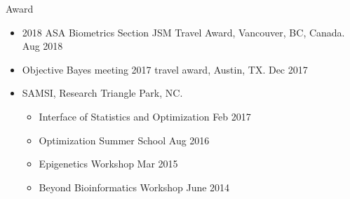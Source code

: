 \documentclass{resume} %
\begin{document}
\begin{rSection}{Award}
\begin{itemize}[noitemsep,topsep=0pt]
\item 2018 ASA Biometrics Section JSM Travel Award, Vancouver, BC, Canada. \hfill Aug 2018
\end{itemize}

\begin{itemize}[noitemsep,topsep=0pt]
\item Objective Bayes meeting 2017 travel award, Austin, TX. \hfill Dec 2017
\end{itemize}

\begin{itemize}[noitemsep,topsep=0pt]
\item SAMSI, Research Triangle Park, NC.	
\begin{itemize}[noitemsep,topsep=0pt]
\item {Interface of Statistics and Optimization} \hfill Feb 2017
\item {Optimization Summer School} \hfill Aug 2016
\item {Epigenetics Workshop} \hfill Mar 2015
\item {Beyond Bioinformatics Workshop} \hfill June 2014
\end{itemize}

\end{itemize}

\end{rSection}

\end{document}
